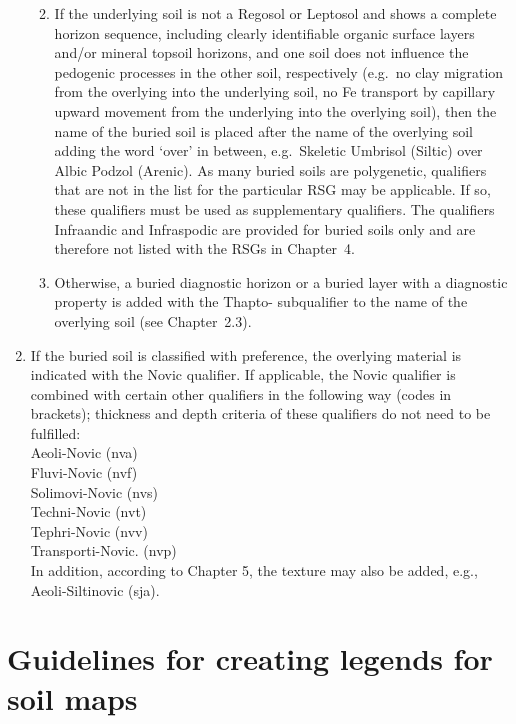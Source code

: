 \documentclass[
  letterpaper,
  DIV=11,
  numbers=noendperiod]{scrreprt}
\begin{document}
\begin{enumerate}
  \begin{enumerate}
  \def\labelenumii{\alph{enumii}.}
  \item
    If the underlying soil is not a Regosol or Leptosol and shows a
    complete horizon sequence, including clearly identifiable organic
    surface layers and/or mineral topsoil horizons, and one soil does
    not influence the pedogenic processes in the other soil,
    respectively (e.g.~no clay migration from the overlying into the
    underlying soil, no Fe transport by capillary upward movement from
    the underlying into the overlying soil), then the name of the buried
    soil is placed after the name of the overlying soil adding the word
    `over' in between, e.g.~Skeletic Umbrisol (Siltic) over Albic Podzol
    (Arenic). As many buried soils are polygenetic, qualifiers that are
    not in the list for the particular RSG may be applicable. If so,
    these qualifiers must be used as supplementary qualifiers. The
    qualifiers Infraandic and Infraspodic are provided for buried soils
    only and are therefore not listed with the RSGs in Chapter~4.
  \item
    Otherwise, a buried diagnostic horizon or a buried layer with a
    diagnostic property is added with the Thapto- subqualifier to the
    name of the overlying soil (see Chapter~2.3).
  \end{enumerate}
\item
  If the buried soil is classified with preference, the overlying
  material is indicated with the Novic qualifier. If applicable, the
  Novic qualifier is combined with certain other qualifiers in the
  following way (codes in brackets); thickness and depth criteria of
  these qualifiers do not need to be fulfilled:\\
  Aeoli-Novic (nva)\\
  Fluvi-Novic (nvf)\\
  Solimovi-Novic (nvs)\\
  Techni-Novic (nvt)\\
  Tephri-Novic (nvv)\\
  Transporti-Novic. (nvp)\\
  In addition, according to Chapter 5, the texture may also be added,
  e.g., Aeoli-Siltinovic (sja).
\end{enumerate}

\hypertarget{guidelines-for-creating-legends-for-soil-maps}{%
\section{Guidelines for creating legends for soil
maps}\label{guidelines-for-creating-legends-for-soil-maps}}
\end{document}
